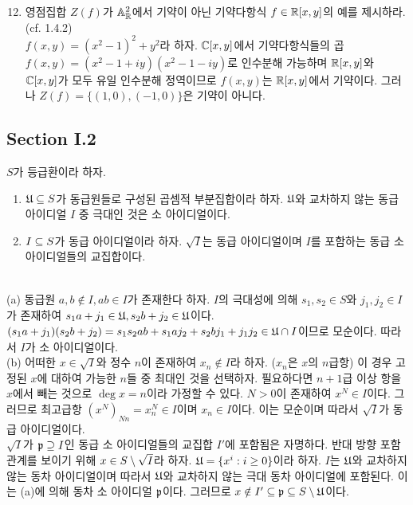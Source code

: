 	\begin{enumerate}[label=\tb{1.\arabic*.},itemindent=0mm,itemsep=4mm,topsep=4mm]
		\setcounter{enumi}{11}
		\item 영점집합 $Z(f)$가 $\mathbb{A}_\mathbb R^2$에서 기약이 아닌 기약다항식 $f\in\mathbb R[x,y]$의 예를 제시하라. (cf. 1.4.2)\\
		\sol $f(x,y)=(x^2-1)^2+y^2$라 하자. $\mathbb C[x,y]$에서 기약다항식들의 곱 $f(x,y)=(x^2-1+iy)(x^2-1-iy)$로 인수분해 가능하며
		$\mathbb R[x,y]$와 $\mathbb C[x,y]$가 모두 유일 인수분해 정역이므로 $f(x,y)$는 $\mathbb R[x,y]$에서 기약이다.
		그러나 $Z(f)=\{(1,0),(-1,0)\}$은 기약이 아니다.
	\end{enumerate}
	
	
	
	\subsection*{Section I.2}
	
	\begin{lemma*}[등급환의 성질]
	$S$가 등급환이라 하자.
	\begin{enumerate}[label=(\alph*)]
	\item $\mathfrak{U}\subseteq S$가 동급원들로 구성된 곱셈적 부분집합이라 하자.
	$\mathfrak{U}$와 교차하지 않는 동급 아이디얼 $I$ 중 극대인 것은 소 아이디얼이다.
	\item $I\subseteq S$가 동급 아이디얼이라 하자. $\sqrt I$는 동급 아이디얼이며 $I$를 포함하는 동급 소 아이디얼들의 교집합이다.
	\end{enumerate}
	\tn{}\\\pf (a) 동급원 $a,b\notin I,ab\in I$가 존재한다 하자.
	$I$의 극대성에 의해 $s_1,s_2\in S$와 $j_1,j_2\in I$가 존재하여 $s_1a+j_1\in\mathfrak{U},s_2b+j_2\in\mathfrak{U}$이다.
	$(s_1a+j_1)(s_2b+j_2)=s_1s_2ab+s_1aj_2+s_2bj_1+j_1j_2\in\mathfrak{U}\cap I$이므로 모순이다. 따라서 $I$가 소 아이디얼이다.\\
	(b) 어떠한 $x\in\sqrt I$와 정수 $n$이 존재하여 $x_n\notin I$라 하자. ($x_n$은 $x$의 $n$급항)
	이 경우 고정된 $x$에 대하여 가능한 $n$들 중 최대인 것을 선택하자.
	필요하다면 $n+1$급 이상 항을 $x$에서 빼는 것으로 $\deg x=n$이라 가정할 수 있다.
	$N>0$이 존재하여 $x^N\in I$이다. 그러므로 최고급항 $(x^N)_{Nn}=x_n^N\in I$이며 $x_n\in I$이다.
	이는 모순이며 따라서 $\sqrt I$가 동급 아이디얼이다.\\
	$\sqrt I$가 $\mathfrak{p}\supseteq I$인 동급 소 아이디얼들의 교집합 $I'$에 포함됨은 자명하다.
	반대 방향 포함 관계를 보이기 위해 $x\in S\setminus\sqrt I$라 하자. $\mathfrak{U}=\{x^i:i\ge 0\}$이라 하자.
	$I$는 $\mathfrak{U}$와 교차하지 않는 동차 아이디얼이며 따라서 $\mathfrak{U}$와 교차하지 않는 극대 동차 아이디얼에 포함된다.
	이는 (a)에 의해 동차 소 아이디얼 $\mathfrak{p}$이다. 그러므로 $x\notin I'\subseteq\mathfrak{p}\subseteq S\setminus\mathfrak{U}$이다.
	\end{lemma*}
	
